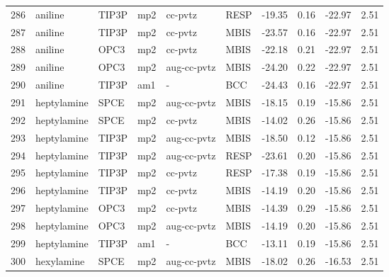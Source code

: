 \begin{tabular}{llllllrrrr}
286 &                        aniline &      TIP3P &      mp2 &      cc-pvtz &         RESP & -19.35 &      0.16 &      -22.97 &     2.51 \\
287 &                        aniline &      TIP3P &      mp2 &      cc-pvtz &         MBIS & -23.57 &      0.16 &      -22.97 &     2.51 \\
288 &                        aniline &       OPC3 &      mp2 &      cc-pvtz &         MBIS & -22.18 &      0.21 &      -22.97 &     2.51 \\
289 &                        aniline &       OPC3 &      mp2 &  aug-cc-pvtz &         MBIS & -24.20 &      0.22 &      -22.97 &     2.51 \\
290 &                        aniline &      TIP3P &      am1 &            - &          BCC & -24.43 &      0.16 &      -22.97 &     2.51 \\
291 &                    heptylamine &       SPCE &      mp2 &  aug-cc-pvtz &         MBIS & -18.15 &      0.19 &      -15.86 &     2.51 \\
292 &                    heptylamine &       SPCE &      mp2 &      cc-pvtz &         MBIS & -14.02 &      0.26 &      -15.86 &     2.51 \\
293 &                    heptylamine &      TIP3P &      mp2 &  aug-cc-pvtz &         MBIS & -18.50 &      0.12 &      -15.86 &     2.51 \\
294 &                    heptylamine &      TIP3P &      mp2 &  aug-cc-pvtz &         RESP & -23.61 &      0.20 &      -15.86 &     2.51 \\
295 &                    heptylamine &      TIP3P &      mp2 &      cc-pvtz &         RESP & -17.38 &      0.19 &      -15.86 &     2.51 \\
296 &                    heptylamine &      TIP3P &      mp2 &      cc-pvtz &         MBIS & -14.19 &      0.20 &      -15.86 &     2.51 \\
297 &                    heptylamine &       OPC3 &      mp2 &      cc-pvtz &         MBIS & -14.39 &      0.29 &      -15.86 &     2.51 \\
298 &                    heptylamine &       OPC3 &      mp2 &  aug-cc-pvtz &         MBIS & -14.19 &      0.20 &      -15.86 &     2.51 \\
299 &                    heptylamine &      TIP3P &      am1 &            - &          BCC & -13.11 &      0.19 &      -15.86 &     2.51 \\
300 &                     hexylamine &       SPCE &      mp2 &  aug-cc-pvtz &         MBIS & -18.02 &      0.26 &      -16.53 &     2.51 \\

\end{tabular}
